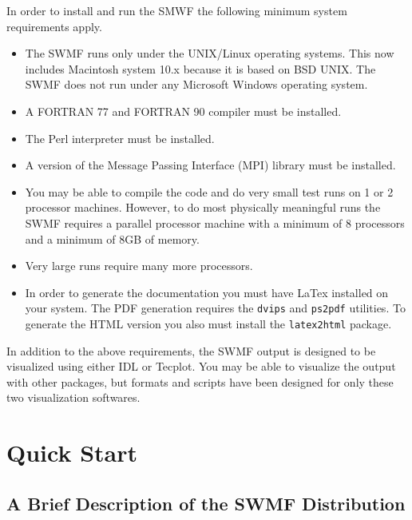 In order to install and run the SMWF the following minimum system
requirements apply.

\begin{itemize}
\item The SWMF runs only under the UNIX/Linux operating systems.  This now
  includes Macintosh system 10.x because it is based on BSD UNIX.  The
  SWMF does not run under any Microsoft Windows operating system.
\item A FORTRAN 77 and FORTRAN 90 compiler must be installed.
\item The Perl interpreter must be installed.
\item A version of the Message Passing Interface (MPI) library must be
  installed.
\item You may be able to compile the code and do very small test
runs on 1 or 2 processor machines.  However, to do most physically
meaningful runs the SWMF requires a
parallel processor machine with a minimum of 8 processors and a minimum of 8GB of
memory.
\item Very large runs require many more processors.
\item In order to generate the documentation you must have LaTex installed on
your system.  The PDF generation requires the {\tt dvips} and {\tt ps2pdf}
utilities.  To generate the HTML version you also must install the
{\tt latex2html} package. 

\end{itemize}


In addition to the above requirements, the SWMF output is designed to
be visualized using either IDL or Tecplot.  You may be able to
visualize the output with other packages, but formats and scripts have
been designed for only these two visualization softwares.





\chapter{Quick Start}

\section{A Brief Description of the SWMF Distribution}

